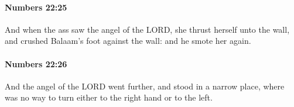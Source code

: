 		\paragraph{Numbers 22:25} %
			\label{NUMBERS-22-25}

			And when the ass saw the angel of the LORD, she thrust herself unto the wall, and crushed Balaam’s foot against the wall: and he smote her again.


		\paragraph{Numbers 22:26} %
			\label{NUMBERS-22-26}

			And the angel of the LORD went further, and stood in a narrow place, where was no way to turn either to the right hand or to the left.


